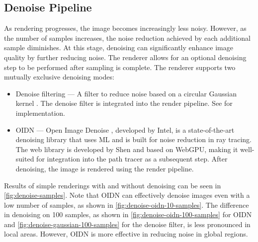 \subsection*{Denoise Pipeline}

As rendering progresses, the image becomes increasingly less noisy. However, as the number of samples increases, the noise reduction achieved by each additional sample diminishes. At this stage, denoising can significantly enhance image quality by further reducing noise. The renderer allows for an optional denoising step to be performed after sampling is complete. The renderer supports two mutually exclusive denoising modes:

\begin{itemize}
  \item{Denoise filtering} — A filter to reduce noise based on a circular Gaussian kernel \cite{conventionalGaussianDenoise}. The denoise filter is integrated into the render pipeline. See  for implementation.
  \item{\gls{OIDN}} — Open Image Denoise \cite{openImageDenoise}, developed by Intel, is a state-of-the-art denoising library that uses \gls{ML} and is built for noise reduction in ray tracing. The web library is developed by Shen \cite{oidnWeb} and based on \gls{WebGPU}, making it well-suited for integration into the path tracer as a subsequent step. After denoising, the image is rendered using the render pipeline.
\end{itemize}

Results of simple renderings with and without denoising can be seen in \autoref{fig:denoise-samples}. Note that \gls{OIDN} can effectively denoise images even with a low number of samples, as shown in \autoref{fig:denoise-oidn-10-samples}. The difference in denoising on 100 samples, as shown in \autoref{fig:denoise-oidn-100-samples} for \gls{OIDN} and \autoref{fig:denoise-gaussian-100-samples} for the denoise filter, is less pronounced in local areas. However, \gls{OIDN} is more effective in reducing noise in global regions.

